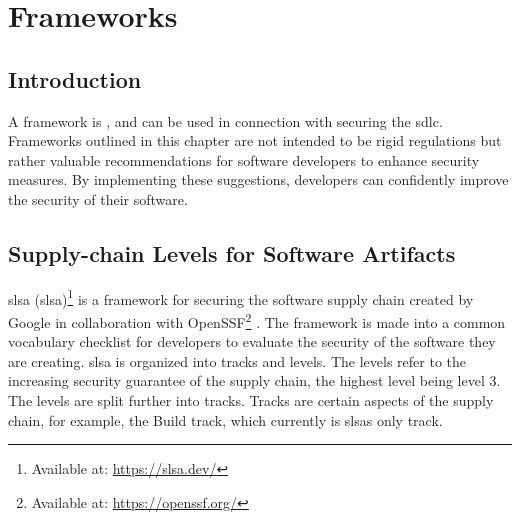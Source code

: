 \newpage
\section{Frameworks}
\subsection{Introduction}
A framework is \textit{} \cite{FrameworkDefinition}, and can be used in connection with securing the \acrshort{sdlc}. Frameworks outlined in this chapter are not intended to be rigid regulations but rather valuable recommendations for software developers to enhance security measures. By implementing these suggestions, developers can confidently improve the security of their software.

\subsection{Supply-chain Levels for Software Artifacts}
\acrlong{slsa} (\acrshort{slsa})\footnote{Available at: \url{https://slsa.dev/}} is a framework for securing the software supply chain created by Google in collaboration with OpenSSF\footnote{Available at: \url{https://openssf.org/}} \cite{SLSAgeneral}. The framework is made into a common vocabulary checklist for developers to evaluate the security of the software they are creating. \acrshort{slsa} is organized into tracks and levels. The levels refer to the increasing security guarantee of the supply chain, the highest level being level 3. The levels are split further into tracks. Tracks are certain aspects of the supply chain, for example, the Build track, which currently is \acrshort{slsa}s only track. 

